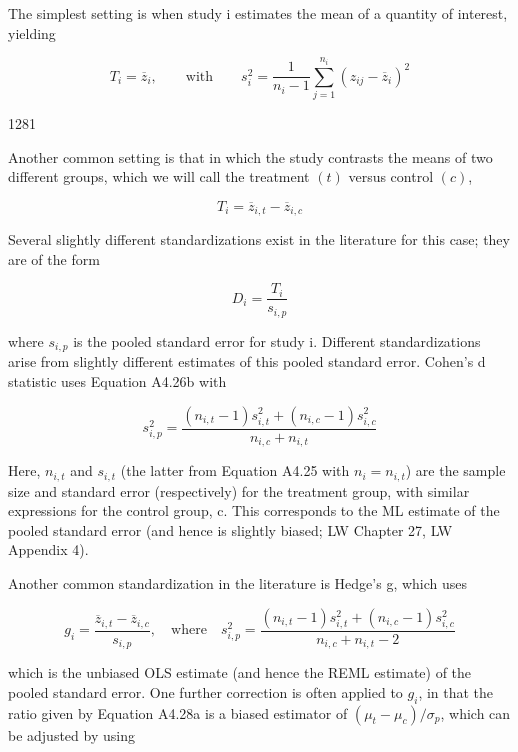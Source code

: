\documentclass{article}
\begin{document}
The simplest setting is when study i estimates the mean of a quantity of interest, yielding

\begin{equation}
T_{i}=\overline{z}_{i},\qquad\mathrm{w i t h}\qquad s_{i}^{2}=\frac{1}{n_{i}-1}\sum_{j=1}^{n_{i}}\left(z_{i j}-\overline{z}_{i}\right)^{2}
\end{equation}

1281

Another common setting is that in which the study contrasts the means of two different groups, which we will call the treatment  $ (t) $ versus control  $ (c) $,

\begin{equation}
T_{i}=\overline{z}_{i,t}-\overline{z}_{i,c}
\end{equation}

Several slightly different standardizations exist in the literature for this case; they are of the form

\begin{equation}
D_{i}=\frac{T_{i}}{s_{i,p}}
\end{equation}

where  $ s_{i,p} $ is the pooled standard error for study i. Different standardizations arise from slightly different estimates of this pooled standard error. Cohen's d statistic uses Equation A4.26b with

\begin{equation}
s_{i,p}^{2}=\frac{(n_{i,t}-1)s_{i,t}^{2}+(n_{i,c}-1)s_{i,c}^{2}}{n_{i,c}+n_{i,t}}
\end{equation}

Here,  $ n_{i,t} $ and  $ s_{i,t} $ (the latter from Equation A4.25 with  $ n_i = n_{i,t} $) are the sample size and standard error (respectively) for the treatment group, with similar expressions for the control group, c. This corresponds to the ML estimate of the pooled standard error (and hence is slightly biased; LW Chapter 27, LW Appendix 4).

Another common standardization in the literature is Hedge's g, which uses

\begin{equation}
g_{i}=\frac{\overline{z}_{i,t}-\overline{z}_{i,c}}{s_{i,p}},\quad\mathrm{w h e r e}\quad s_{i,p}^{2}=\frac{(n_{i,t}-1)s_{i,t}^{2}+(n_{i,c}-1)s_{i,c}^{2}}{n_{i,c}+n_{i,t}-2}
\end{equation}

which is the unbiased OLS estimate (and hence the REML estimate) of the pooled standard error. One further correction is often applied to  $ g_i $, in that the ratio given by Equation A4.28a is a biased estimator of  $ (\mu_t - \mu_c)/\sigma_p $, which can be adjusted by using
\end{document}
